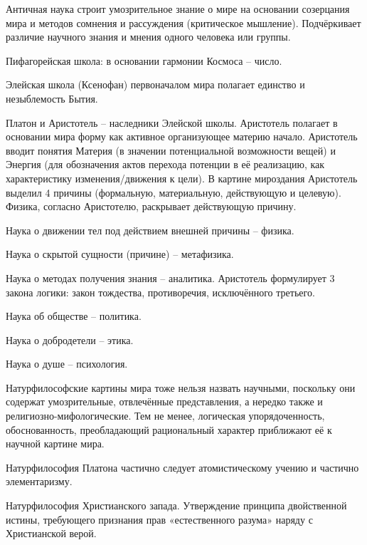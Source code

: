 \documentclass[exam_answers.tex]{subfiles}
\begin{document}
\renewcommand{\baselinestretch}{0.75}

Античная наука строит умозрительное знание о мире на основании созерцания мира и методов сомнения и рассуждения (критическое мышление).
Подчёркивает различие научного знания и мнения одного человека или группы.

Пифагорейская школа: в основании гармонии Космоса – число.

Элейская школа (Ксенофан) первоначалом мира полагает единство и незыблемость Бытия.

Платон и Аристотель – наследники Элейской школы. Аристотель полагает в основании мира форму как активное организующее материю начало.
Аристотель вводит понятия Материя (в значении потенциальной возможности вещей) и Энергия (для обозначения актов перехода потенции в её реализацию, как характеристику изменения/движения к цели).
В картине мироздания Аристотель выделил 4 причины (формальную, материальную, действующую и целевую).
Физика, согласно Аристотелю, раскрывает действующую причину.

Наука о движении тел под действием внешней причины – физика.

Наука о скрытой сущности (причине) – метафизика.

Наука о методах получения знания – аналитика.
Аристотель формулирует 3 закона логики: закон тождества, противоречия, исключённого третьего.

Наука об обществе – политика.

Наука о добродетели – этика.

Наука о душе – психология.

Натурфилософские картины мира тоже нельзя назвать научными, поскольку они содержат умозрительные, отвлечённые представления, а нередко также и религиозно-мифологические.
Тем не менее, логическая упорядоченность, обоснованность, преобладающий рациональный характер приближают её к научной картине мира.

Натурфилософия Платона частично следует атомистическому учению и частично элементаризму.

Натурфилософия Христианского запада.
Утверждение принципа двойственной истины, требующего признания прав «естественного разума» наряду с Христианской верой.
\end{document}
